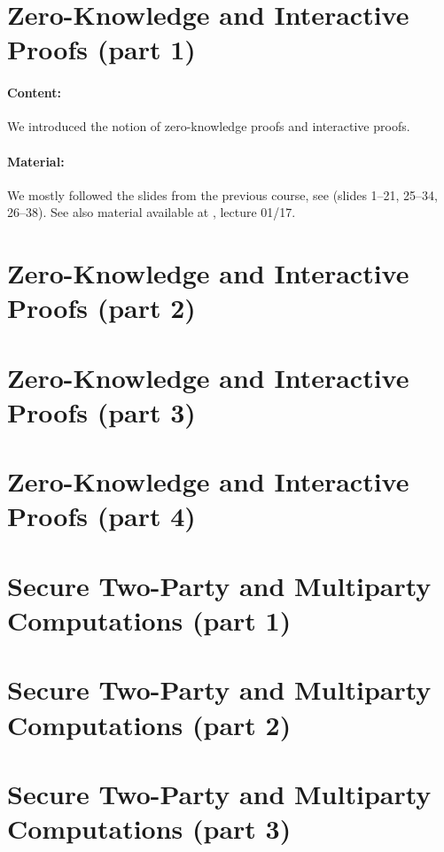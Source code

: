 \documentclass{llncs}
\begin{document}
\section{Zero-Knowledge and Interactive Proofs (part 1)}

\paragraph{Content:} We introduced the notion of zero-knowledge proofs and interactive proofs.

\paragraph{Material:}   We mostly followed the slides from the previous course, see \cite{ZK} (slides 1--21, 25--34, 26--38). See also material available at \cite{ZKlearning}, lecture 01/17.


\section{Zero-Knowledge and Interactive Proofs (part 2)}

\section{Zero-Knowledge and Interactive Proofs (part 3)}

\section{Zero-Knowledge and Interactive Proofs (part 4)}

\section{Secure Two-Party and Multiparty Computations (part 1)}

\section{Secure Two-Party and Multiparty Computations (part 2)}

\section{Secure Two-Party and Multiparty Computations (part 3)}
\end{document}
